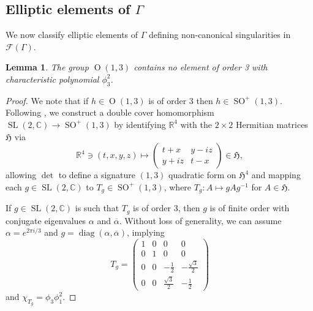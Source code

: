 \documentclass[12pt, a4paper]{article}
\newtheorem{lemma}[thm]{Lemma}
\newcommand{\RR}{\mathbb{R}}
\newcommand{\CC}{\mathbb{C}}
\newcommand{\fc}{\mathcal{F}}
\newcommand{\opn}{\operatorname}
\newcommand{\Hf}{\mathfrak{H}}
\newcommand{\bpm}{\begin{pmatrix}}
\newcommand{\epm}{\end{pmatrix}}
\begin{document}
\subsection{Elliptic elements of $\Gamma$} 
We now classify elliptic elements of $\Gamma$ defining non-canonical singularities in $\fc(\Gamma)$.
\begin{lemma}\label{UA2_3tors}
  The group $\opn{O}(1,3)$ contains no element of order 3 with characteristic polynomial $\phi_3^2$.
\end{lemma}
\begin{proof}
  We note that if $h \in \opn{O}(1,3)$ is of order 3 then $h \in \opn{SO}^+(1,3)$. 
  Following \cite[p.55]{CarterSegalMacdonald}, we construct a double cover homomorphism $\opn{SL}(2, \CC) \rightarrow \opn{SO}^+(1,3)$ by identifying $\RR^4$ with the $2 \times 2$ Hermitian matrices $\Hf$ via 
  \[
  \RR^4 \ni (t,x,y,z) \mapsto
  \bpm
  t + x & y - iz \\
  y + iz & t - x
  \epm \in \Hf,  
  \]
  allowing $\opn{det}$ to define a signature $(1,3)$ quadratic form on $\Hf^4$ and mapping each $g \in \opn{SL}(2, \CC)$ to $T_g \in \opn{SO}^+(1,3)$, where $T_g: A \mapsto g A g^{-1}$ for $A \in \Hf$.


  If $g \in \opn{SL}(2, \CC)$ is such that $T_g$ is of order 3,
  then $g$ is of finite order with conjugate eigenvalues $\alpha$ and $\overline{\alpha}$.
  Without loss of generality, we can assume $\alpha = e^{2 \pi i /3}$ and $g = \opn{diag}(\alpha, \overline{\alpha})$, implying 
  \[
  T_g =
  \bpm
  1 & 0 & 0 & 0 \\
  0 & 1 & 0 & 0 \\
  0 & 0 & -\frac{1}{2} & -\frac{\sqrt{3}}{2} \\
  0 & 0 & \frac{\sqrt{3}}{2} & -\frac{1}{2}
  \epm
  \]
  and $\chi_{T_g} = \phi_3 \phi_1^2$.
\end{proof}
\end{document}
